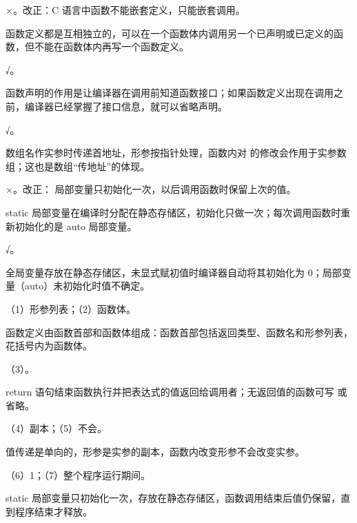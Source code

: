 \documentclass[a4paper,11pt]{article}
\begin{document}

\q ×。改正：C 语言中函数不能嵌套定义，只能嵌套调用。\begin{analysis}函数定义都是互相独立的，可以在一个函数体内调用另一个已声明或已定义的函数，但不能在函数体内再写一个函数定义。\end{analysis}

\q √。\begin{analysis}函数声明的作用是让编译器在调用前知道函数接口；如果函数定义出现在调用之前，编译器已经掌握了接口信息，就可以省略声明。\end{analysis}

\q √。\begin{analysis}数组名作实参时传递首地址，形参按指针处理，函数内对  的修改会作用于实参数组；这也是数组“传地址”的体现。\end{analysis}

\q ×。改正： 局部变量只初始化一次，以后调用函数时保留上次的值。\begin{analysis}static 局部变量在编译时分配在静态存储区，初始化只做一次；每次调用函数时重新初始化的是 auto 局部变量。\end{analysis}

\q √。\begin{analysis}全局变量存放在静态存储区，未显式赋初值时编译器自动将其初始化为 0；局部变量（auto）未初始化时值不确定。\end{analysis}


\q （1）形参列表；（2）函数体。\begin{analysis}函数定义由函数首部和函数体组成：函数首部包括返回类型、函数名和形参列表，花括号内为函数体。\end{analysis}

\q （3）。\begin{analysis}return 语句结束函数执行并把表达式的值返回给调用者；无返回值的函数可写  或省略。\end{analysis}

\q （4）副本；（5）不会。\begin{analysis}值传递是单向的，形参是实参的副本，函数内改变形参不会改变实参。\end{analysis}

\q （6）1；（7）整个程序运行期间。\begin{analysis}static 局部变量只初始化一次，存放在静态存储区，函数调用结束后值仍保留，直到程序结束才释放。\end{analysis}
\end{document}
